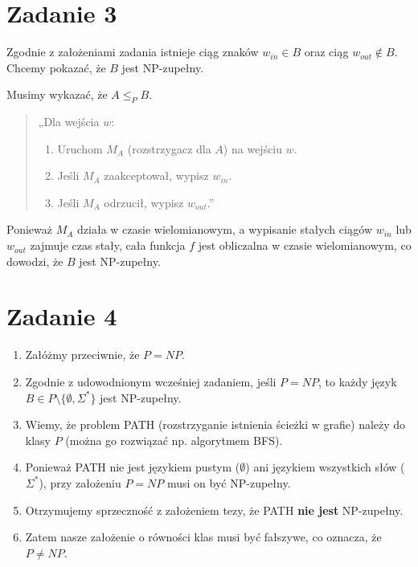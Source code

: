 \documentclass{article}
\begin{document}
\section{Zadanie 3}
Zgodnie z założeniami zadania istnieje ciąg znaków $w_{in} \in B$ oraz ciąg $w_{out} \notin B$. Chcemy pokazać, że $B$ jest NP-zupełny.

Musimy wykazać, że $A \le_P B$.

\begin{quote}
„Dla wejścia $w$:
\begin{enumerate}
    \item Uruchom $M_A$ (rozstrzygacz dla $A$) na wejściu $w$.
    \item Jeśli $M_A$ zaakceptował, wypisz $w_{in}$.
    \item Jeśli $M_A$ odrzucił, wypisz $w_{out}$.”
\end{enumerate}
\end{quote}

Ponieważ $M_A$ działa w czasie wielomianowym, a wypisanie stałych ciągów $w_{in}$ lub $w_{out}$ zajmuje czas stały, cała funkcja $f$ jest obliczalna w czasie wielomianowym, co dowodzi, że $B$ jest NP-zupełny.

\section{Zadanie 4}
\begin{enumerate}
    \item Załóżmy przeciwnie, że $P = NP$.
    \item Zgodnie z udowodnionym wcześniej zadaniem, jeśli $P = NP$, to każdy język $B \in P \setminus \{\emptyset, \Sigma^*\}$ jest NP-zupełny.
    \item Wiemy, że problem PATH (rozstrzyganie istnienia ścieżki w grafie) należy do klasy $P$ (można go rozwiązać np. algorytmem BFS).
    \item Ponieważ PATH nie jest językiem pustym ($\emptyset$) ani językiem wszystkich słów ($\Sigma^*$), przy założeniu $P = NP$ musi on być NP-zupełny.
    \item Otrzymujemy sprzeczność z założeniem tezy, że PATH \textbf{nie jest} NP-zupełny.
    \item Zatem nasze założenie o równości klas musi być fałszywe, co oznacza, że $P \neq NP$.
\end{enumerate}
\end{document}

